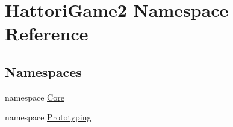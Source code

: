 \hypertarget{namespace_hattori_game2}{}\section{Hattori\+Game2 Namespace Reference}
\label{namespace_hattori_game2}
\subsection*{Namespaces}
\begin{DoxyCompactItemize}
\item 
namespace \hyperlink{namespace_hattori_game2_1_1_core}{Core}
\item 
namespace \hyperlink{namespace_hattori_game2_1_1_prototyping}{Prototyping}
\end{DoxyCompactItemize}
